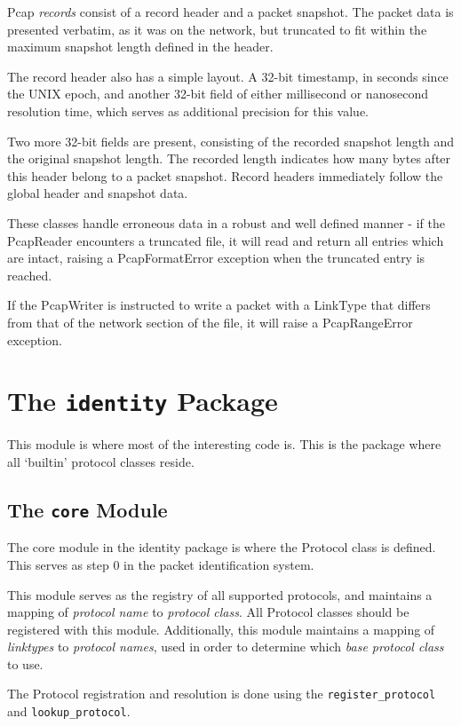 \documentclass[10pt,a4paper,notitlepage,twoside]{report}
\begin{document}
Pcap \emph{records} consist of a record header and a packet snapshot. The packet data is presented verbatim, as it was on the network, but truncated to fit within the maximum snapshot length defined in the header.

The record header also has a simple layout. A 32-bit timestamp, in seconds since the UNIX epoch, and another 32-bit field of either millisecond or nanosecond resolution time, which serves as additional precision for this value.

Two more 32-bit fields are present, consisting of the recorded snapshot length and the original snapshot length. The recorded length indicates how many bytes after this header belong to a packet snapshot. Record headers immediately follow the global header and snapshot data.

These classes handle erroneous data in a robust and well defined manner - if the PcapReader encounters a truncated file, it will read and return all entries which are intact, raising a PcapFormatError exception when the truncated entry is reached.
 
If the PcapWriter is instructed to write a packet with a LinkType that differs from that of the network section of the file, it will raise a PcapRangeError exception.

\section{The \texttt{identity} Package}
This module is where most of the interesting code is. This is the package where all `builtin' protocol classes reside.

\subsection{The \texttt{core} Module}
The core module in the identity package is where the Protocol class is defined. This serves as step 0 in the packet identification system.

This module serves as the registry of all supported protocols, and maintains a mapping of \emph{protocol name} to \emph{protocol class}. All Protocol classes should be registered with this module. Additionally, this module maintains a mapping of \emph{linktypes} to \emph{protocol names}, used in order to determine  which \emph{base protocol class} to use.

The Protocol registration and resolution is done using the \texttt{register_protocol} and \texttt{lookup_protocol}.
 
\end{document}

